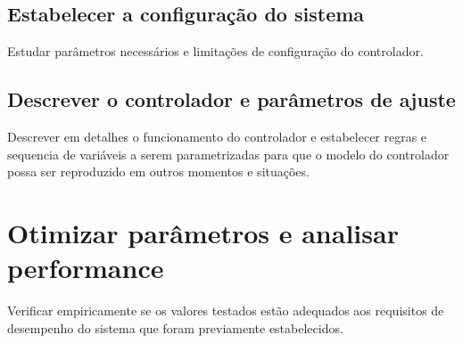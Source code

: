 \subsection{ Estabelecer a configuração do sistema }
Estudar parâmetros necessários e limitações de configuração do controlador.

\subsection{ Descrever o controlador e parâmetros de ajuste }

Descrever em detalhes o funcionamento do controlador e estabelecer regras e sequencia de variáveis a serem parametrizadas para que o modelo do controlador possa ser reproduzido em outros momentos e situações.

\section{ Otimizar parâmetros e analisar performance }

Verificar empiricamente se os valores testados estão adequados aos requisitos de desempenho do sistema que foram previamente estabelecidos. 



